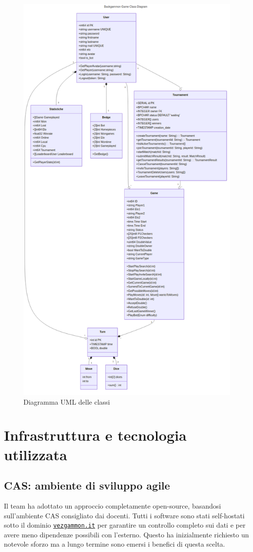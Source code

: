 \documentclass{article}
\begin{document}
\begin{figure}[H]
    \centering
    \includegraphics[width=12cm, width=8cm]{uml-classes}
    \caption{Diagramma UML delle classi}
    \label{fig:class-diagram}
\end{figure}

\section{Infrastruttura e tecnologia utilizzata}

\subsection{CAS: ambiente di sviluppo agile}

Il team ha adottato un approccio completamente open-source, basandosi sull'ambiente CAS consigliato dai docenti. 
Tutti i software sono stati self-hostati sotto il dominio \href{https://vezgammon.it}{\texttt{vezgammon.it}} per garantire 
un controllo completo sui dati e per avere meno dipendenze possibili con l'esterno. Questo ha inizialmente richiesto 
un notevole sforzo ma a lungo termine sono emersi i benefici di questa scelta.
\end{document}
